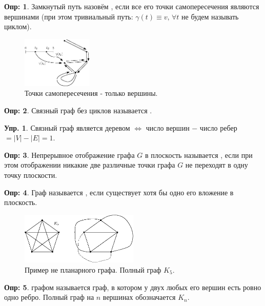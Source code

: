 \documentclass[12pt]{article}
\theoremstyle{definition}
\newtheorem{defn}{Опр:}
\newtheorem{exrc}{Упр.}
\begin{document}
\begin{defn}
	Замкнутый путь назовём , если все его точки самопересечения являются вершинами (при этом тривиальный путь: $\gamma(t) \equiv v, \, \forall t$ не будем называть циклом).
\end{defn}
\begin{figure}[H]
	\centering
	\includegraphics[width=0.3\textwidth]{GATL2_3.eps}
	\caption{Точки самопересечения - только вершины.}
	\label{2_3}
\end{figure}

\begin{defn}
	Связный граф без циклов называется .
\end{defn}

\begin{exrc}
	Связный граф является деревом $\Leftrightarrow$ число вершин $-$ число ребер $ = |V| - |E|= 1$.
\end{exrc}

\begin{defn}
	Непрерывное отображение графа $G$ в плоскость называется , если при этом отображении никакие две различные точки графа $G$ не переходят в одну точку плоскости.
\end{defn}

\begin{defn}
	Граф называется , если существует хотя бы одно его вложение в плоскость.
\end{defn}

\begin{figure}[H]
	\centering
	\includegraphics[width=0.5\textwidth]{GATL2_4.eps}
	\caption{Пример не планарного графа. Полный граф $K_5$.}
	\label{2_4}
\end{figure}

\begin{defn}
	 графом называется граф, в котором у двух любых его вершин есть ровно одно ребро. Полный граф на $n$ вершинах обозначается $K_n$. 
\end{defn}
\end{document}
